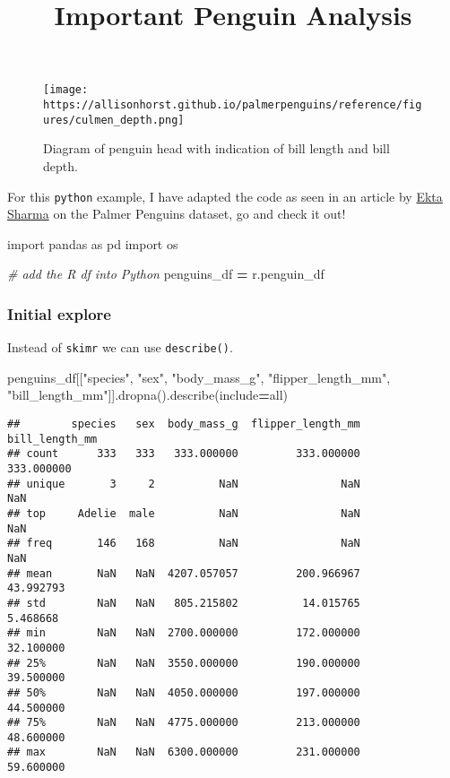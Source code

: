 \documentclass[
]{article}
\title{Important Penguin Analysis}
\author{}
\date{\vspace{-2.5em}}
\newenvironment{Shaded}{\begin{snugshade}}{\end{snugshade}}
\newcommand{\CommentTok}[1]{\textcolor[rgb]{0.56,0.35,0.01}{\textit{#1}}}
\newcommand{\ImportTok}[1]{#1}
\newcommand{\NormalTok}[1]{#1}
\newcommand{\OperatorTok}[1]{\textcolor[rgb]{0.81,0.36,0.00}{\textbf{#1}}}
\newcommand{\StringTok}[1]{\textcolor[rgb]{0.31,0.60,0.02}{#1}}
\begin{document}
\maketitle

\begin{figure}
\centering
\texttt{[image: https://allisonhorst.github.io/palmerpenguins/reference/figures/culmen\_depth.png]}
\caption{Diagram of penguin head with indication of bill length and bill
depth.}
\end{figure}

For this \texttt{python} example, I have adapted the code as seen in an
article by
\href{https://towardsdatascience.com/plotly-pandas-for-the-palmer-penguins-f5cdab3c16c8}{Ekta
Sharma} on the Palmer Penguins dataset, go and check it out!

\begin{Shaded}
\begin{Highlighting}[]
\ImportTok{import}\NormalTok{ pandas }\ImportTok{as}\NormalTok{ pd}
\ImportTok{import}\NormalTok{ os}

\CommentTok{\# add the R df into Python}
\NormalTok{penguins\_df }\OperatorTok{=}\NormalTok{ r.penguin\_df}
\end{Highlighting}
\end{Shaded}

\hypertarget{initial-explore}{%
\subsubsection{Initial explore}\label{initial-explore}}

Instead of \texttt{skimr} we can use \texttt{describe()}.

\begin{Shaded}
\begin{Highlighting}[]
\NormalTok{penguins\_df[[}\StringTok{"species"}\NormalTok{, }\StringTok{"sex"}\NormalTok{, }\StringTok{"body\_mass\_g"}\NormalTok{, }\StringTok{"flipper\_length\_mm"}\NormalTok{, }\StringTok{"bill\_length\_mm"}\NormalTok{]].dropna().describe(include}\OperatorTok{=}\StringTok{\textquotesingle{}all\textquotesingle{}}\NormalTok{)}
\end{Highlighting}
\end{Shaded}

\begin{verbatim}
##        species   sex  body_mass_g  flipper_length_mm  bill_length_mm
## count      333   333   333.000000         333.000000      333.000000
## unique       3     2          NaN                NaN             NaN
## top     Adelie  male          NaN                NaN             NaN
## freq       146   168          NaN                NaN             NaN
## mean       NaN   NaN  4207.057057         200.966967       43.992793
## std        NaN   NaN   805.215802          14.015765        5.468668
## min        NaN   NaN  2700.000000         172.000000       32.100000
## 25%        NaN   NaN  3550.000000         190.000000       39.500000
## 50%        NaN   NaN  4050.000000         197.000000       44.500000
## 75%        NaN   NaN  4775.000000         213.000000       48.600000
## max        NaN   NaN  6300.000000         231.000000       59.600000
\end{verbatim}
\end{document}
